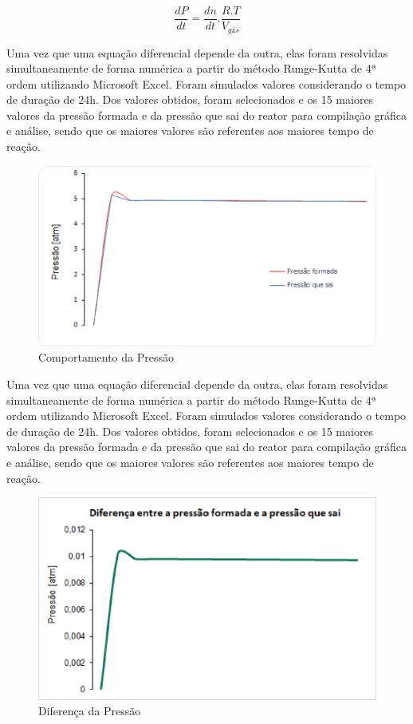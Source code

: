 \[\frac{dP}{dt}=\frac{dn}{dt}.\frac{R.T}{V_{gás}}\]

Uma vez que uma equação diferencial depende da outra, elas foram resolvidas simultaneamente de forma numérica a partir do método Runge-Kutta de 4ª ordem utilizando Microsoft Excel. Foram simulados valores considerando o tempo de duração de 24h. Dos valores obtidos, foram selecionados e os 15 maiores valores da pressão formada e da pressão que sai do reator para compilação gráfica e análise, sendo que os maiores valores são referentes aos maiores tempo de reação.

\begin{figure}[H]
 \centering
 \includegraphics[keepaspectratio=true,scale=0.5]{figuras/pressao.eps}
 \caption{Comportamento da Pressão}
 \label{pressao}
\end{figure}

Uma vez que uma equação diferencial depende da outra, elas foram resolvidas simultaneamente de forma numérica a partir do método Runge-Kutta de 4ª ordem utilizando Microsoft Excel. Foram simulados valores considerando o tempo de duração de 24h. Dos valores obtidos, foram selecionados e os 15 maiores valores da pressão formada e da pressão que sai do reator para compilação gráfica e análise, sendo que os maiores valores são referentes aos maiores tempo de reação.

\begin{figure}[h]
 \centering
 \includegraphics[keepaspectratio=true,scale=0.5]{figuras/pressao2.eps}
 \caption{Diferença da Pressão}
 \label{pressao2}
\end{figure}

